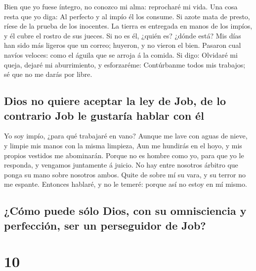  Bien que yo fuese íntegro, no conozco mi alma: reprocharé
mi vida.  Una cosa resta que yo diga: Al perfecto y al
impío él los consume.  Si azote mata de presto, ríese de la
prueba de los inocentes.  La tierra es entregada en manos
de los impíos, y él cubre el rostro de sus jueces. Si no es él, ¿quién
es? ¿dónde está?  Mis días han sido más ligeros que un
correo; huyeron, y no vieron el bien.  Pasaron cual navíos
veloces: como el águila que se arroja á la comida.  Si
digo: Olvidaré mi queja, dejaré mi aburrimiento, y esforzaréme:
 Contúrbanme todos mis trabajos; sé que no me darás por
libre.

\hypertarget{dios-no-quiere-aceptar-la-ley-de-job-de-lo-contrario-job-le-gustaruxeda-hablar-con-uxe9l}{%
\subsection{Dios no quiere aceptar la ley de Job, de lo contrario Job le
gustaría hablar con
él}\label{dios-no-quiere-aceptar-la-ley-de-job-de-lo-contrario-job-le-gustaruxeda-hablar-con-uxe9l}}

 Yo soy impío, ¿para qué trabajaré en vano? 
Aunque me lave con aguas de nieve, y limpie mis manos con la misma
limpieza,  Aun me hundirás en el hoyo, y mis propios
vestidos me abominarán.  Porque no es hombre como yo, para
que yo le responda, y vengamos juntamente á juicio.  No hay
entre nosotros árbitro que ponga su mano sobre nosotros ambos.
 Quite de sobre mí su vara, y su terror no me espante.
 Entonces hablaré, y no le temeré: porque así no estoy en
mí mismo.

\hypertarget{cuxf3mo-puede-suxf3lo-dios-con-su-omnisciencia-y-perfecciuxf3n-ser-un-perseguidor-de-job}{%
\subsection{¿Cómo puede sólo Dios, con su omnisciencia y perfección, ser
un perseguidor de
Job?}\label{cuxf3mo-puede-suxf3lo-dios-con-su-omnisciencia-y-perfecciuxf3n-ser-un-perseguidor-de-job}}

\hypertarget{section-9}{%
\section{10}\label{section-9}}


